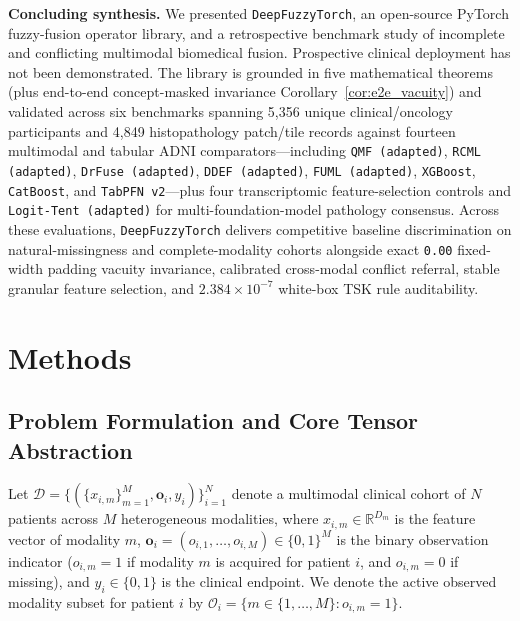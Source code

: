 \documentclass[10pt,twocolumn]{article}
\begin{document}
\noindent\textbf{Concluding synthesis.} We presented \texttt{DeepFuzzyTorch}, an open-source
PyTorch fuzzy-fusion operator library,
and a retrospective benchmark study of incomplete and conflicting multimodal biomedical
fusion. Prospective clinical deployment has not been demonstrated. The library is grounded
in five mathematical theorems
(plus end-to-end concept-masked invariance Corollary~\ref{cor:e2e_vacuity}) and validated
across six benchmarks spanning 5,356 unique clinical/oncology participants and 4,849
histopathology patch/tile records against fourteen multimodal and tabular ADNI
comparators---including \texttt{QMF (adapted)}, \texttt{RCML (adapted)},
\texttt{DrFuse (adapted)}, \texttt{DDEF (adapted)}, \texttt{FUML (adapted)},
\texttt{XGBoost}, \texttt{CatBoost}, and \texttt{TabPFN~v2}---plus four transcriptomic
feature-selection controls and \texttt{Logit-Tent (adapted)} for multi-foundation-model
pathology consensus. Across these evaluations,
\texttt{DeepFuzzyTorch} delivers competitive baseline discrimination on natural-missingness
and complete-modality cohorts alongside exact \texttt{0.00} fixed-width padding vacuity
invariance, calibrated cross-modal conflict referral, stable granular feature selection, and
$2.384 \times 10^{-7}$ white-box TSK rule auditability.

\section{Methods}
\label{sec:method}

\subsection{Problem Formulation and Core Tensor Abstraction}
\label{sec:design_principles}

Let $\mathcal{D} = \{(\{x_{i,m}\}_{m=1}^M, \bm{o}_i, y_i)\}_{i=1}^N$ denote a multimodal
clinical cohort of $N$ patients across $M$ heterogeneous modalities, where $x_{i,m} \in
\mathbb{R}^{D_m}$ is the feature vector of modality $m$, $\bm{o}_i = (o_{i,1},\dots,o_{i,M})
\in \{0,1\}^M$ is the binary observation indicator ($o_{i,m}=1$ if modality $m$ is acquired for
patient $i$, and $o_{i,m}=0$ if missing), and $y_i \in \{0,1\}$ is the clinical endpoint. We
denote the active observed modality subset for patient $i$ by $\mathcal{O}_i = \{m \in
\{1,\dots,M\} : o_{i,m}=1\}$.
\end{document}
